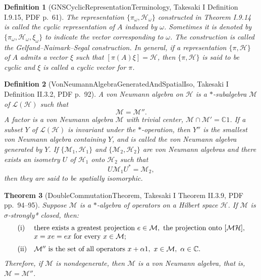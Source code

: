 \documentclass{article}
\newtheorem{definition}{Definition}
\newtheorem{theorem}[definition]{Theorem}
\begin{document}
\begin{definition}[GNSCyclicRepresentationTerminology, Takesaki I Definition I.9.15, PDF p.~61]
The representation \(\{\pi_\omega,\mathcal H_\omega\}\) constructed in
Theorem I.9.14 is called the cyclic representation of \(A\) induced by
\(\omega\).  Sometimes it is denoted by
\(\{\pi_\omega,\mathcal H_\omega,\xi_\omega\}\) to indicate the vector
corresponding to \(\omega\).  The construction is called the
Gelfand--Naimark--Segal construction.  In general, if a representation
\(\{\pi,\mathcal H\}\) of \(A\) admits a vector \(\xi\) such that
\([\pi(A)\xi]=\mathcal H\), then \(\{\pi,\mathcal H\}\) is said to be cyclic
and \(\xi\) is called a cyclic vector for \(\pi\).
\end{definition}

\begin{definition}[VonNeumannAlgebraGeneratedAndSpatialIso, Takesaki I Definition II.3.2, PDF p.~92]
A von Neumann algebra on \(\mathcal H\) is a \(*\)-subalgebra
\(\mathcal M\) of \(\mathcal L(\mathcal H)\) such that
\[
  \mathcal M=\mathcal M''.
\]
A factor is a von Neumann algebra \(\mathcal M\) with trivial center,
\(\mathcal M\cap\mathcal M'=\mathbb C1\).  If a subset \(Y\) of
\(\mathcal L(\mathcal H)\) is invariant under the \(*\)-operation, then
\(Y''\) is the smallest von Neumann algebra containing \(Y\), and is called
the von Neumann algebra generated by \(Y\).  If
\(\{\mathcal M_1,\mathcal H_1\}\) and
\(\{\mathcal M_2,\mathcal H_2\}\) are von Neumann algebras and there exists
an isometry \(U\) of \(\mathcal H_1\) onto \(\mathcal H_2\) such that
\[
  U\mathcal M_1U^*=\mathcal M_2,
\]
then they are said to be spatially isomorphic.
\end{definition}

\begin{theorem}[DoubleCommutationTheorem, Takesaki I Theorem II.3.9, PDF pp.~94--95]
Suppose \(\mathcal M\) is a \(*\)-algebra of operators on a Hilbert space
\(\mathcal H\).  If \(\mathcal M\) is \(\sigma\)-strongly* closed, then:
\[
\begin{array}{ll}
\textnormal{(i)}&
\textnormal{there exists a greatest projection }e\in\mathcal M,\textnormal{
the projection onto }[\mathcal M\mathcal H],\\
&
x=xe=ex\textnormal{ for every }x\in\mathcal M;\\[2mm]
\textnormal{(ii)}&
\mathcal M''\textnormal{ is the set of all operators }x+\alpha 1,
\ x\in\mathcal M,\ \alpha\in\mathbb C.
\end{array}
\]
Therefore, if \(\mathcal M\) is nondegenerate, then \(\mathcal M\) is a von
Neumann algebra, that is, \(\mathcal M=\mathcal M''\).
\end{theorem}
\end{document}

